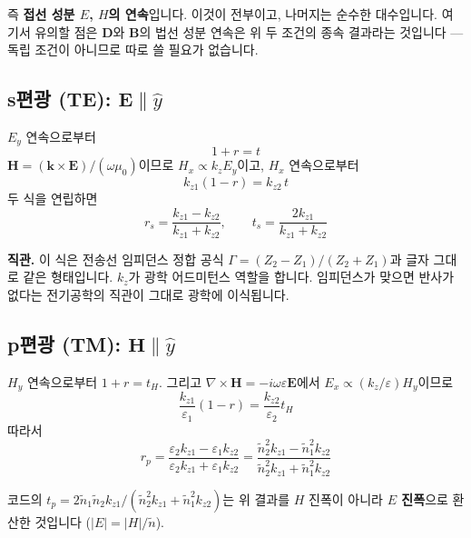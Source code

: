 \documentclass[10pt,a4paper]{article}
\newcommand{\note}[1]{%
  \begin{tcolorbox}[enhanced,breakable,colback=white,colframe=accent,
    boxrule=0pt,leftrule=1.6pt,arc=0pt,outer arc=0pt,
    left=6pt,right=2pt,top=3pt,bottom=3pt,boxsep=0pt,
    before skip=5pt, after skip=8pt]
  #1
  \end{tcolorbox}}
\newcommand{\nt}{\tilde n}
\begin{document}
즉 \textbf{접선 성분 $E$, $H$의 연속}입니다. 이것이 전부이고, 나머지는 순수한 대수입니다. 여기서 유의할 점은 $\mathbf{D}$와 $\mathbf{B}$의 법선 성분 연속은 위 두 조건의 종속 결과라는 것입니다 — 독립 조건이 아니므로 따로 쓸 필요가 없습니다.

\subsection{\texorpdfstring{s편광 (TE): $\mathbf{E}\parallel\hat y$}{s편광 (TE)}}

$E_y$ 연속으로부터
\begin{equation}
1 + r = t
\end{equation}
$\mathbf{H} = (\mathbf{k}\times\mathbf{E})/(\omega\mu_0)$이므로 $H_x \propto k_z E_y$이고, $H_x$ 연속으로부터
\begin{equation}
k_{z1}(1-r) = k_{z2}\,t
\end{equation}
두 식을 연립하면
\begin{equation}
\boxed{\;r_s = \frac{k_{z1}-k_{z2}}{k_{z1}+k_{z2}}, \qquad
t_s = \frac{2k_{z1}}{k_{z1}+k_{z2}}\;}
\end{equation}

\note{\textbf{직관.} 이 식은 전송선 임피던스 정합 공식 $\Gamma=(Z_2-Z_1)/(Z_2+Z_1)$과 글자 그대로 같은 형태입니다. $k_z$가 광학 어드미턴스 역할을 합니다. 임피던스가 맞으면 반사가 없다는 전기공학의 직관이 그대로 광학에 이식됩니다.}

\subsection{\texorpdfstring{p편광 (TM): $\mathbf{H}\parallel\hat y$}{p편광 (TM)}}

$H_y$ 연속으로부터 $1+r = t_H$. 그리고 $\nabla\times\mathbf{H} = -i\omega\varepsilon\mathbf{E}$에서 $E_x \propto (k_z/\varepsilon)H_y$이므로
\begin{equation}
\frac{k_{z1}}{\varepsilon_1}(1-r) = \frac{k_{z2}}{\varepsilon_2}t_H
\end{equation}
따라서
\begin{equation}
\boxed{\;r_p = \frac{\varepsilon_2 k_{z1}-\varepsilon_1 k_{z2}}{\varepsilon_2 k_{z1}+\varepsilon_1 k_{z2}}
= \frac{\nt_2^2 k_{z1}-\nt_1^2 k_{z2}}{\nt_2^2 k_{z1}+\nt_1^2 k_{z2}}\;}
\end{equation}

코드의 $t_p = 2\nt_1\nt_2 k_{z1}/(\nt_2^2k_{z1}+\nt_1^2k_{z2})$는 위 결과를 $H$ 진폭이 아니라 \textbf{$E$ 진폭}으로 환산한 것입니다 ($|E| = |H|/\nt$).
\end{document}
